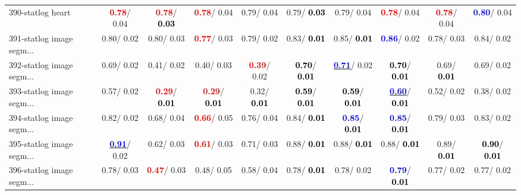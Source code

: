 \begin{table}[h]
\begin{center}
{\begin{tabular}{lc|c|c|c|c|c|c|c|c}
390-statlog heart & \textcolor{red}{\textbf{  0.78}}/  0.04 & \textcolor{red}{\textbf{  0.78}}/\textcolor{black}{\textbf{  0.03}} & \textcolor{red}{\textbf{  0.78}}/  0.04 &   0.79/  0.04 &   0.79/\textcolor{black}{\textbf{  0.03}} &   0.79/  0.04 & \textcolor{red}{\textbf{  0.78}}/  0.04 & \textcolor{red}{\textbf{  0.78}}/  0.04 & \textcolor{blue}{\textbf{  0.80}}/  0.04 \\
391-statlog image segm... &   0.80/  0.02 &   0.80/  0.03 & \textcolor{red}{\textbf{  0.77}}/  0.03 &   0.79/  0.02 &   0.83/\textcolor{black}{\textbf{  0.01}} &   0.85/\textcolor{black}{\textbf{  0.01}} & \textcolor{blue}{\textbf{  0.86}}/  0.02 &   0.78/  0.03 &   0.84/  0.02 \\ \hline
392-statlog image segm... &   0.69/  0.02 &   0.41/  0.02 &   0.40/  0.03 & \textcolor{red}{\textbf{  0.39}}/  0.02 & \textcolor{black}{\textbf{  0.70}}/\textcolor{black}{\textbf{  0.01}} & \underline{\textcolor{blue}{\textbf{  0.71}}}/  0.02 & \textcolor{black}{\textbf{  0.70}}/\textcolor{black}{\textbf{  0.01}} &   0.69/\textcolor{black}{\textbf{  0.01}} &   0.69/  0.02 \\
393-statlog image segm... &   0.57/  0.02 & \textcolor{red}{\textbf{  0.29}}/\textcolor{black}{\textbf{  0.01}} & \textcolor{red}{\textbf{  0.29}}/\textcolor{black}{\textbf{  0.01}} &   0.32/\textcolor{black}{\textbf{  0.01}} & \textcolor{black}{\textbf{  0.59}}/\textcolor{black}{\textbf{  0.01}} & \textcolor{black}{\textbf{  0.59}}/\textcolor{black}{\textbf{  0.01}} & \underline{\textcolor{blue}{\textbf{  0.60}}}/\textcolor{black}{\textbf{  0.01}} &   0.52/  0.02 &   0.38/  0.02 \\
394-statlog image segm... &   0.82/  0.02 &   0.68/  0.04 & \textcolor{red}{\textbf{  0.66}}/  0.05 &   0.76/  0.04 &   0.84/\textcolor{black}{\textbf{  0.01}} & \textcolor{blue}{\textbf{  0.85}}/\textcolor{black}{\textbf{  0.01}} & \textcolor{blue}{\textbf{  0.85}}/\textcolor{black}{\textbf{  0.01}} &   0.79/  0.03 &   0.83/  0.02 \\
395-statlog image segm... & \underline{\textcolor{blue}{\textbf{  0.91}}}/  0.02 &   0.62/  0.03 & \textcolor{red}{\textbf{  0.61}}/  0.03 &   0.71/  0.03 &   0.88/\textcolor{black}{\textbf{  0.01}} &   0.88/\textcolor{black}{\textbf{  0.01}} &   0.88/\textcolor{black}{\textbf{  0.01}} &   0.89/\textcolor{black}{\textbf{  0.01}} & \textcolor{black}{\textbf{  0.90}}/\textcolor{black}{\textbf{  0.01}} \\
396-statlog image segm... &   0.78/  0.03 & \textcolor{red}{\textbf{  0.47}}/  0.03 &   0.48/  0.05 &   0.58/  0.04 &   0.78/\textcolor{black}{\textbf{  0.01}} &   0.78/  0.02 & \textcolor{blue}{\textbf{  0.79}}/\textcolor{black}{\textbf{  0.01}} &   0.77/  0.02 &   0.77/  0.02 \\

\end{tabular}}
\end{center}
\end{table}
